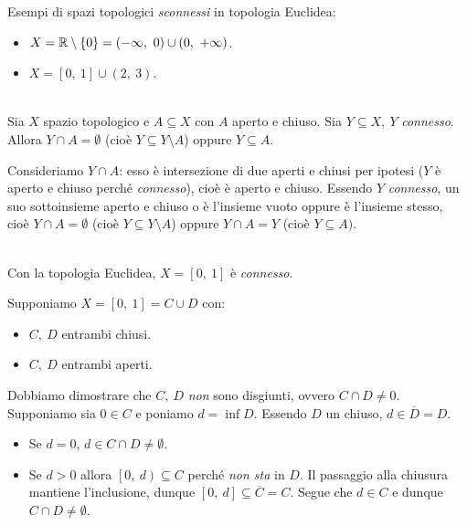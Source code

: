 \begin{examples} Esempi di spazi topologici \textit{sconnessi} in topologia Euclidea:
	\begin{itemize}
		\item $X=\realset\setminus\left\{0\right\}=\left(-\infty,\ 0\right)\cup \left(0,\ +\infty\right)$.
		\item $X=\left[0,\ 1\right]\cup \left(2,\ 3\right)$.
	\end{itemize}
\vspace{-3mm}
\end{examples}
\begin{lemming}~{}\\
Sia $X$ spazio topologico e $A\subseteq X$ con $A$ aperto e chiuso. Sia $Y\subseteq X,\ Y$ \textit{connesso}. Allora $Y\cap A=\emptyset$ (cioè $Y\subseteq Y\setminus A$) oppure $Y\subseteq A$.
\end{lemming}
\begin{demonstration}
Consideriamo $Y\cap A$: esso è intersezione di due aperti e chiusi per ipotesi ($Y$ è aperto e chiuso perché \textit{connesso}), cioè è aperto e chiuso. Essendo $Y$ \textit{connesso}, un suo sottoinsieme aperto e chiuso o è l'insieme vuoto oppure è l'insieme stesso, cioè $Y\cap A=\emptyset$ (cioè $Y\subseteq Y\setminus A$) oppure $Y\cap A=Y$ (cioè $Y\subseteq A)$.
\end{demonstration}
\begin{theorema}~{}\\
Con la topologia Euclidea, $X=\left[0,\ 1\right]$ è \textit{connesso}.
\end{theorema}
\begin{demonstration}
Supponiamo $X=\left[0,\ 1\right]=C\cup D$ con:
\begin{itemize}
	\item $C,\ D$ entrambi chiusi.
	\item $C,\ D$ entrambi aperti.
\end{itemize}
Dobbiamo dimostrare che $C,\ D$ \textit{non} sono disgiunti, ovvero $C\cap D\neq 0$. Supponiamo sia $0\in C$ e poniamo $d=\inf D$. Essendo $D$ un chiuso, $d\in \overline{D}=D$.
\begin{itemize}
	\item Se $d=0$, $d\in C\cap D\neq \emptyset$.
	\item Se $d>0$ allora $\left[0,\ d\right)\subseteq C$ perché \textit{non sta} in $D$. Il passaggio alla chiusura mantiene l'inclusione, dunque $\left[0,\ d\right]\subseteq \overline{C}=C$. Segue che $d\in C$ e dunque $C\cap D\neq \emptyset$.
\end{itemize}
\vspace{-3mm}
\end{demonstration}
